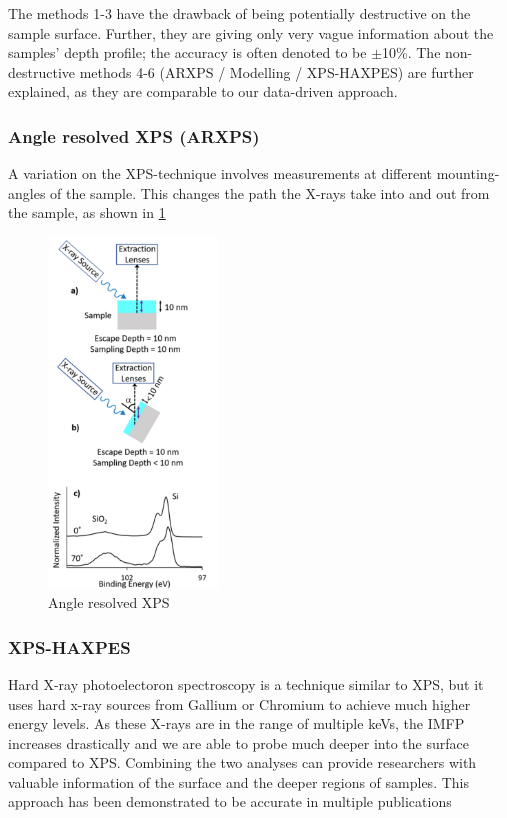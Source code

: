 The methods 1-3 have the drawback of being potentially destructive on the sample surface. Further, they are giving only very vague information about the samples’ depth profile; the accuracy is often denoted to be $\pm$10\%.
The non-destructive methods 4-6 (ARXPS / Modelling / XPS-HAXPES) are further explained, as they are comparable to our data-driven approach.

\subsubsection{Angle resolved XPS (ARXPS)}

A variation on the XPS-technique involves measurements at different mounting-angles of the sample.
This changes the path the X-rays take into and out from the sample, as shown in \ref{fig:arxps}

\begin{figure}
    \centering
    \includegraphics[width=0.4\textwidth]{Figures/ARXPS.png}
    \caption{Angle resolved XPS \cite{stevie_introduction_2020}}
    \label{fig:arxps}
\end{figure}


\subsubsection{XPS-HAXPES}

Hard X-ray photoelectoron spectroscopy is a technique similar to XPS, but it uses hard x-ray sources from Gallium or Chromium to achieve much higher energy levels. As these X-rays are in the range of multiple keVs, the IMFP increases drastically and we are able to probe much deeper into the surface compared to XPS. Combining the two analyses can provide researchers with valuable information of the surface and the deeper regions of samples. This approach has been demonstrated to be accurate in multiple publications \cite{bure_assessing_2023, siol_concepts_2020} 